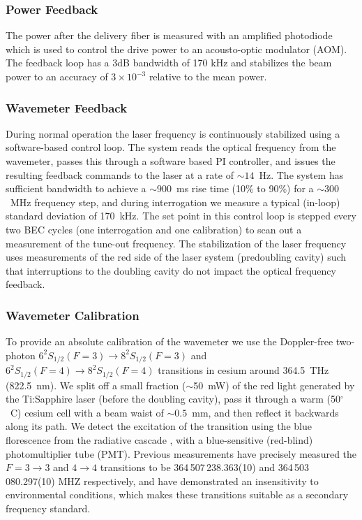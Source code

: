 \documentclass[%
 amsmath,amssymb,
aps,
]{revtex4-2}
\begin{document}
\subsubsection{Power Feedback}
The power after the delivery fiber is measured with an amplified photodiode which is used to control the drive power to an acousto-optic modulator (AOM). The feedback loop has a 3dB bandwidth of 170 kHz and stabilizes the beam power to an accuracy of $ 3\times10^{-3}$ relative to the mean power. 

\subsubsection{Wavemeter Feedback}
During normal operation the laser frequency is continuously stabilized using a software-based control loop. The system reads the optical frequency from the wavemeter, passes this through a software based PI controller, and issues the resulting feedback commands to the laser at a rate of $\sim 14$~Hz. The system has sufficient bandwidth to achieve a $\sim900$~ms rise time (10\% to 90\%) for a $\sim300$~MHz frequency step, and during interrogation we measure a typical (in-loop) standard deviation of 170~kHz.
The set point in this control loop is stepped every two BEC cycles (one interrogation and one calibration) to scan out a measurement of the tune-out frequency. The stabilization of the laser frequency uses measurements of the red side of the laser system (predoubling cavity) such that interruptions to the doubling cavity do not impact the optical frequency feedback.


\subsubsection{Wavemeter Calibration}
To provide an absolute calibration of the wavemeter we use the Doppler-free two-photon $6^{2}S_{1/2} (F=3) \rightarrow 8^{2}S_{1/2} (F=3)$ and $6^{2}S_{1/2} (F=4) \rightarrow 8^{2}S_{1/2} (F=4)$ transitions in cesium around 364.5~THz (822.5~nm). We split off a small fraction ($\sim$50~mW) of the red light generated by the Ti:Sapphire laser (before the doubling cavity), pass it through a warm (50$^{\circ}$~C) cesium cell with a beam waist of $\sim0.5$~mm, and then reflect it backwards along its path.
We detect the excitation of the transition using the blue florescence from the radiative cascade \cite{HAGEL19991}, with a blue-sensitive (red-blind) photomultiplier tube (PMT). Previous measurements \cite{Wu:13,Fendel:07} have precisely measured the $F=3\rightarrow3$ and $4\rightarrow4$ transitions to be 364\,507\,238.363(10) and 364\,503\,080.297(10) MHZ respectively, and have demonstrated an insensitivity to environmental conditions, which makes these transitions suitable as a secondary frequency standard. 
\end{document}
